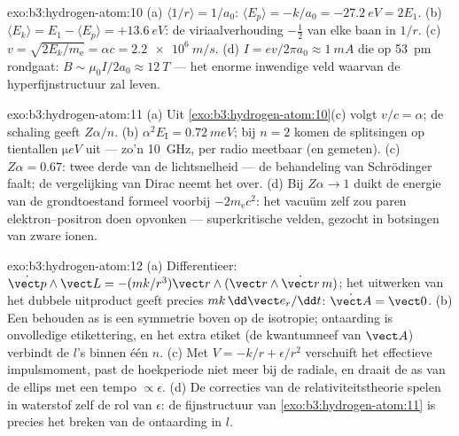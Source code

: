\begin{solution}{exo:b3:hydrogen-atom:10}
(a) $\langle 1/r\rangle = 1/a_0$: $\langle E_p\rangle = -k/a_0 =
\qty{-27.2}{eV} = 2E_1$. (b) $\langle E_k\rangle = E_1 - \langle
E_p\rangle = +\qty{13.6}{eV}$: de viriaalverhouding $-\tfrac12$ van elke
baan in $1/r$. (c) $v = \sqrt{2E_k/m_{\text{e}}} = \alpha c =
\qty{2.2e6}{m/s}$. (d) $I = ev/2\pi a_0 \approx \qty{1}{mA}$ die op
\qty{53}{pm} rondgaat: $B \sim \mu_0I/2a_0 \approx
\qty{12}{T}$ --- het
enorme inwendige veld waarvan de hyperfijnstructuur zal leven.
\end{solution}

\begin{solution}{exo:b3:hydrogen-atom:11}
(a) Uit \cref{exo:b3:hydrogen-atom:10}(c) volgt $v/c = \alpha$; de
schaling geeft $Z\alpha/n$. (b) $\alpha^2E_{\text{I}} = \qty{0.72}{meV}$;
bij $n = 2$ komen de splitsingen op tientallen $\unit{\micro eV}$ uit ---
zo'n \qty{10}{GHz}, per radio meetbaar (en gemeten). (c) $Z\alpha =
0.67$: twee derde van de lichtsnelheid --- de behandeling van Schrödinger
faalt; de vergelijking van Dirac neemt het over. (d) Bij $Z\alpha \to 1$
duikt de energie van de grondtoestand formeel voorbij
$-2m_{\text{e}}c^2$: het vacuüm zelf zou paren elektron--positron doen
opvonken --- superkritische velden, gezocht in botsingen van zware ionen.
\end{solution}

\begin{solution}{exo:b3:hydrogen-atom:12}
(a) Differentieer: $\dot{\vect p}\wedge\vect L = -(mk/r^3)\vect
r\wedge(\vect r\wedge\dot{\vect r}\,m)$; het uitwerken van het dubbele
uitproduct geeft precies $mk\,\dd\vect e_r/\dd t$: $\dot{\vect A} =
\vect 0$. (b) Een behouden as is een symmetrie boven op de isotropie;
ontaarding is onvolledige etikettering, en het extra etiket (de
kwantumneef van $\vect
A$) verbindt de $l$'s binnen één $n$. (c) Met
$V = -k/r + \epsilon/r^2$ verschuift het effectieve impulsmoment, past de
hoekperiode niet meer bij de radiale, en draait de as van de ellips met
een tempo $\propto\epsilon$. (d) De correcties van de
relativiteitstheorie spelen in waterstof zelf de rol van $\epsilon$: de
fijnstructuur van \cref{exo:b3:hydrogen-atom:11} is precies het breken
van de ontaarding in $l$.
\end{solution}

